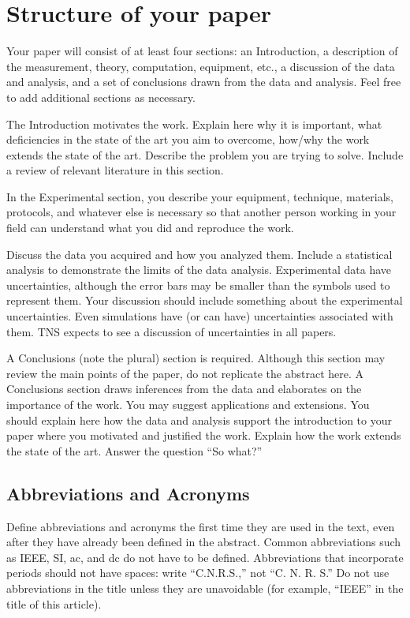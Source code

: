 \documentclass{IEEEtran}
\begin{document}
\section{Structure of your paper}
Your paper will consist of at least four sections: an Introduction, a
description of the measurement, theory, computation, equipment, etc., a
discussion of the data and analysis, and a set of conclusions drawn from the
data and analysis. Feel free to add additional sections as necessary.

The Introduction motivates the work. Explain here why it is important, what
deficiencies in the state of the art you aim to overcome, how/why the work
extends the state of the art. Describe the problem you are trying to solve.
Include a review of relevant literature in this section.

In the Experimental section, you describe your equipment, technique,
materials, protocols, and whatever else is necessary so that another person
working in your field can understand what you did and reproduce the work.

Discuss the data you acquired and how you analyzed them. Include a
statistical analysis to demonstrate the limits of the data analysis.
Experimental data have uncertainties, although the error bars may be smaller
than the symbols used to represent them. Your discussion should include
something about the experimental uncertainties. Even simulations have (or
can have) uncertainties associated with them. TNS expects to see a
discussion of uncertainties in all papers.

A Conclusions (note the plural) section is required. Although this section
may review the main points of the paper, do not replicate the abstract here.
A Conclusions section draws inferences from the data and elaborates on the
importance of the work. You may suggest applications and extensions. You
should explain here how the data and analysis support the introduction to
your paper where you motivated and justified the work. Explain how the work
extends the state of the art. Answer the question ``So what?''

\subsection{Abbreviations and Acronyms}
Define abbreviations and acronyms the first time they are used in the text,
even after they have already been defined in the abstract. Common
abbreviations such as IEEE, SI, ac, and dc do not have to be defined.
Abbreviations that incorporate periods should not have spaces: write
``C.N.R.S.,'' not ``C. N. R. S.'' Do not use abbreviations in the title
unless they are unavoidable (for example, ``IEEE'' in the title of this
article).
\end{document}
